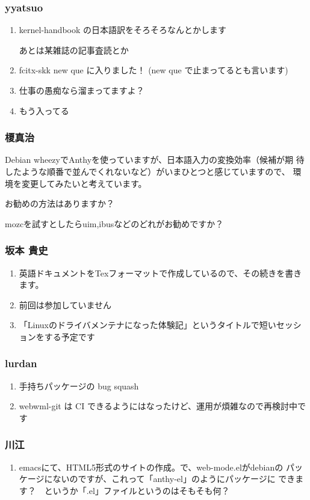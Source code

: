 \documentclass[cjk,dvipdfmx,10pt,compress,%
hyperref={bookmarks=true,bookmarksnumbered=true,bookmarksopen=false,%
colorlinks=false,%
pdftitle={第 85 回 関西 Debian 勉強会},%
pdfauthor={倉敷・のがた・佐々木・かわだ・八津尾},%
pdfsubject={資料},%
}]{beamer}
\begin{document}
\begin{frame}
  \frametitle{ yyatsuo }
  \begin{enumerate}
  \item kernel-handbook の日本語訳をそろそろなんとかします

    あとは某雑誌の記事査読とか
  \item fcitx-skk new que に入りました！
    (new que で止まってるとも言います)
  \item 仕事の愚痴なら溜まってますよ？
  \item もう入ってる
  \end{enumerate}
\end{frame}

\begin{frame}
  \frametitle{ 榎真治 }

  Debian wheezyでAnthyを使っていますが、日本語入力の変換効率（候補が期
  待したような順番で並んでくれないなど）がいまひとつと感じていますので、
  環境を変更してみたいと考えています。

  お勧めの方法はありますか？

  mozcを試すとしたらuim,ibusなどのどれがお勧めですか？
\end{frame}

\begin{frame}
  \frametitle{ 坂本 貴史 }
  \begin{enumerate}
  \item 英語ドキュメントをTexフォーマットで作成しているので、その続きを書きます。
  \item 前回は参加していません
  \item 「Linuxのドライバメンテナになった体験記」というタイトルで短いセッションをする予定です
  \end{enumerate}
\end{frame}

\begin{frame}
  \frametitle{ lurdan }
  \begin{enumerate}
  \item 手持ちパッケージの bug squash
  \item webwml-git は CI できるようにはなったけど、運用が煩雑なので再検討中です
  \end{enumerate}
\end{frame}

\begin{frame}
  \frametitle{ 川江 }
  \begin{enumerate}
  \item emacsにて、HTML5形式のサイトの作成。で、web-mode.elがdebianの
    パッケージにないのですが、これって「anthy-el」のようにパッケージに
    できます？　というか「.el」ファイルというのはそもそも何？
  \end{enumerate}
\end{frame}
\end{document}
